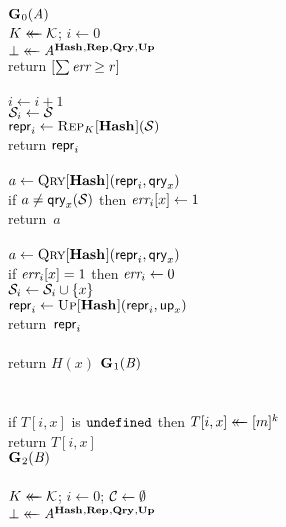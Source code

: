 \begin{figure*}
  {
    \underline{$\game_0(\advA)$}\\[2pt]
      $\key \getsr \keys$; $i \gets 0$\\
      $\bot \getsr \advA^{\HASHO,\REPO,\QRYO,\UPO}$\\
      return $[\sum \err \geq r]$
    \\[6pt]
    \oraclev{$\REPO(\col)$}\\[2pt]
      $i \gets i + 1$\\
      $\col_i \gets \col$\\
      $\pub_i \gets \Rep_K[\HASHO](\col)$\\
      return $\pub_i$
    \\[6pt]
    \\[2pt]
      $a \gets \Qry[\HASHO](\pub_i, \qry_x)$\\
      if $a \neq \qry_x(\col)$ then $\err_i[x] \gets 1$\\
      return~$a$
    \\[6pt]
    \\[2pt]
      $a \gets \Qry[\HASHO](\pub_i, \qry_x)$\\
      if $\err_i[x] = 1$ then $\err_i \gets 0$\\
      $\col_i \gets \col_i \union \{x\}$\\
      $\pub_i \gets \Up[\HASHO](\pub_i,\up_x)$\\
      return~$\pub_i$
    \\[4pt]
    \\[2pt]
      return $H(x)$
  }
  {
  \underline{$\game_1(\advB)$}\\[2pt]\\
    \\
      if $T[i, x]$ is $\undefn$ then $T[i, x] \getsr [m]^k$\\
      return $T[i, x]$
    \\[6pt]
    \underline{$\game_2(\advB)$}\\[2pt]\\
      $\key \getsr \keys$; $i \gets 0$; $\setC \gets \emptyset$\\
      $\bot \getsr \advA^{\HASHO,\REPO,\QRYO,\UPO}$\\
}
\end{figure*}
